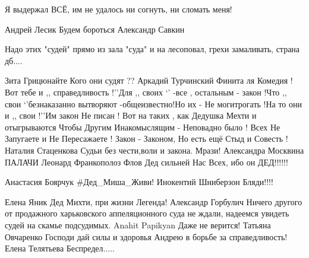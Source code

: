 Я выдержал ВСЁ, им не удалось ни согнуть, ни сломать меня!

Андрей Лесик Будем бороться Александр Савкин

Надо этих "судей" прямо из зала "суда" и на лесоповал, грехи замаливать, страна
дб....

Зита Грицюнайте Кого они судят ?? Аркадий Турчинский Финита ля Комедия ! Вот
тебе и ,, справедливость !’’Для ,, своих ‘’ -все , остальным - закон !Что ,,
свои ‘’безнаказанно вытворяют -общеизвестно!Но их - Не могитрогать !На то они и
,, свои !’’Им закон Не писан ! Вот на таких , как Дедушка Мехти и отыгрываются
Чтобы Другим Инакомыслящим - Неповадно было ! Всех Не Запугаете и Не
Пересажаете ! Закон - Законом, Но есть ещё Стыд и Совесть ! Наталия Стаценкова
Судьи без чести,воли и закона. Мрази! Александра Москвина ПАЛАЧИ Леонард
Франкополоз Флов Дед сильней Нас Всех, ибо он ДЕД!!!!!!

Анастасия Боярчук \#Дед\_Миша\_Живи! Инокентий Шниберзон Бляди!!!!

Елена Яник Дед Михти, при жизни Легенда! Александр Горбулич Ничего другого от
продажного харьковского аппеляционного суда не ждали, надеемся увидеть судей на
скамье подсудимых. Anahit Papikyan Даже не верится! Татьяна Овчаренко Господи
дай силы и здоровья Андрею в борьбе за справедливость! Елена Телятьева
Беспредел.....

